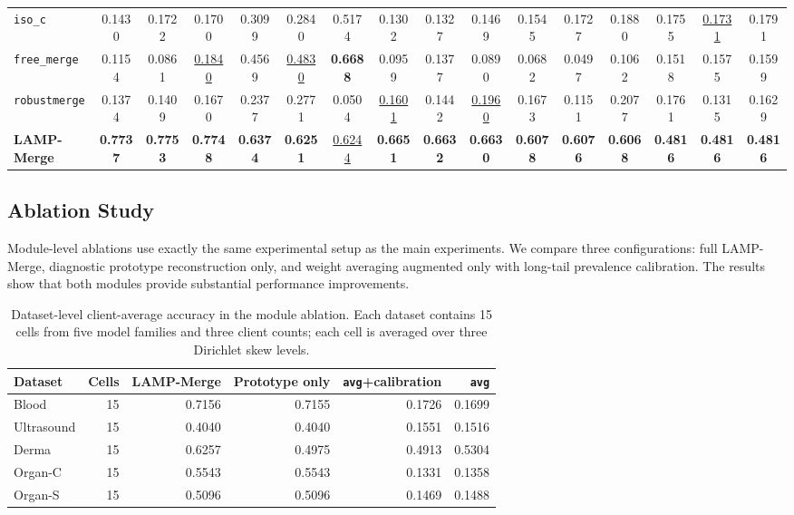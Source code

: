 \documentclass[letterpaper]{article} %
\begin{document}
\begin{table}[t]
{\begin{tabular}{lccccccccccccccc}
\texttt{iso\_c} & 0.1430 & 0.1722 & 0.1700 & 0.3099 & 0.2840 & 0.5174 & 0.1302 & 0.1327 & 0.1469 & 0.1545 & 0.1727 & 0.1880 & 0.1755 & \underline{0.1731} & 0.1791 \\
\texttt{free\_merge} & 0.1154 & 0.0861 & \underline{0.1840} & 0.4569 & \underline{0.4830} & \textbf{0.6688} & 0.0959 & 0.1377 & 0.0890 & 0.0682 & 0.0497 & 0.1062 & 0.1518 & 0.1575 & 0.1599 \\
\texttt{robustmerge} & 0.1374 & 0.1409 & 0.1670 & 0.2377 & 0.2771 & 0.0504 & \underline{0.1601} & 0.1442 & \underline{0.1960} & 0.1673 & 0.1151 & 0.2077 & 0.1761 & 0.1315 & 0.1629 \\
\textbf{LAMP-Merge} & \textbf{0.7737} & \textbf{0.7753} & \textbf{0.7748} & \textbf{0.6374} & \textbf{0.6251} & \underline{0.6244} & \textbf{0.6651} & \textbf{0.6632} & \textbf{0.6630} & \textbf{0.6078} & \textbf{0.6076} & \textbf{0.6068} & \textbf{0.4816} & \textbf{0.4816} & \textbf{0.4816} \\
\hline
\end{tabular}
}
\end{table}



\subsection{Ablation Study}

Module-level ablations use exactly the same experimental setup as the main experiments. We compare three configurations: full LAMP-Merge, diagnostic prototype reconstruction only, and weight averaging augmented only with long-tail prevalence calibration. The results show that both modules provide substantial performance improvements.

\begin{table}[t]
\centering
\caption{Dataset-level client-average accuracy in the module ablation. Each dataset contains 15 cells from five model families and three client counts; each cell is averaged over three Dirichlet skew levels.}
\label{tab:dataset-ablation-acc}
\scriptsize
\setlength{\tabcolsep}{3.0pt}
\begin{tabular}{lrrrrr}
\hline
Dataset & Cells & LAMP-Merge & Prototype only & \texttt{avg}+calibration & \texttt{avg} \\
\hline
Blood & 15 & 0.7156 & 0.7155 & 0.1726 & 0.1699 \\
Ultrasound & 15 & 0.4040 & 0.4040 & 0.1551 & 0.1516 \\
Derma & 15 & 0.6257 & 0.4975 & 0.4913 & 0.5304 \\
Organ-C & 15 & 0.5543 & 0.5543 & 0.1331 & 0.1358 \\
Organ-S & 15 & 0.5096 & 0.5096 & 0.1469 & 0.1488 \\
\hline
\end{tabular}
\end{table}
\end{document}
